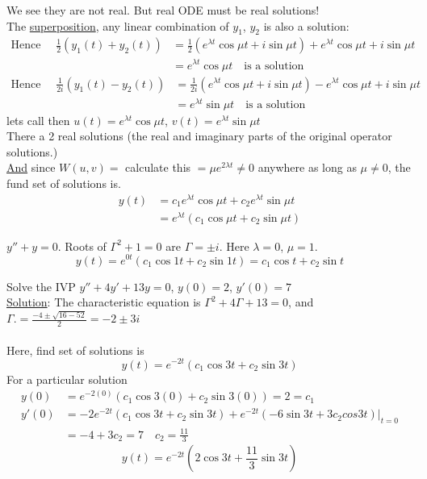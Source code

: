 We see they are not real. But real ODE must be real solutions!\\
The \underline{superposition}, any linear combination of $y_1$, $y_2$ is also a solution:
\begin{align*}
	\text{Hence } \quad \frac{1}{2}(y_1(t) + y_2(t))  & = \frac{1}{2} (e^{\lambda t} \cos \mu t + i \sin \mu t) + e^{\lambda t} \cos \mu t + i \sin \mu t\\
	& = e^{\lambda t} \cos \mu t \quad \text{is a solution}
\end{align*}
\begin{align*}
	\text{Hence } \quad \frac{1}{2i}(y_1(t) - y_2(t))  & = \frac{1}{2i} (e^{\lambda t} \cos \mu t + i \sin \mu t) - e^{\lambda t} \cos \mu t + i \sin \mu t\\ & = e^{\lambda t} \sin \mu t \quad \text{is a solution}
\end{align*}
lets call then $u(t) = e^{\lambda t} \cos \mu t$, \quad $v(t)=e^{\lambda t} \sin \mu t$\\
There a 2 real solutions (the real and imaginary parts of the original operator solutions.)\\
\underline{And} since $W(u,v) = $ calculate this $= \mu e^{2 \lambda t} \neq 0$ anywhere as long as $\mu \neq 0$, the fund set of solutions is.
\begin{align*}
	y(t) & = c_1 e^{\lambda t} \cos \mu t + c_2 e^{\lambda t} \sin \mu t \\
	& = e^{\lambda t}(c_1 \cos \mu t + c_2 \sin \mu t)
\end{align*}
\begin{example-N}
	$y'' + y = 0$. Roots of $\Gamma^2 + 1 = 0$ are $\Gamma = \pm i$. Here $\lambda = 0$, $\mu = 1$.
	\begin{equation*}
		y(t) = e^{0t}(c_1 \cos 1t + c_2 \sin 1t) = \boxed{c_1 \cos t + c_2 \sin t}
	\end{equation*}
\end{example-N}
\begin{example-N}
	Solve the IVP $y'' + 4y' + 13y = 0$, $y(0) = 2$, $y'(0) = 7$\\
	\underline{Solution}: The characteristic equation is $\Gamma^2 + 4\Gamma + 13 = 0$, and $\Gamma. = \frac{-4 \pm \sqrt{16 - 52}}{2} = -2 \pm 3i$\\\\
	Here, find set of solutions is 
	\begin{equation*}
		y(t) = e^{-2t}(c_1 \cos 3t + c_2 \sin 3t)
	\end{equation*}
	For a particular solution
	\begin{align*}
		y(0) & = e^{-2(0)}(c_1 \cos 3(0) + c_2 \sin 3(0)) = \boxed{2 = c_1}\\
		y'(0) & = -2e^{-2t}(c_1 \cos 3t + c_2 \sin 3t) + e^{-2t}(-6 \sin 3t + 3c_2 cos 3t) \Bigg|_{t=0} \\
		& = -4 + 3c_2 = 7 \quad c_2 = \frac{11}{3}
	\end{align*}
	\begin{equation*}
		\boxed{y(t) = e^{-2t}(2 \cos 3t + \frac{11}{3} \sin 3t)}
	\end{equation*}
\end{example-N}
